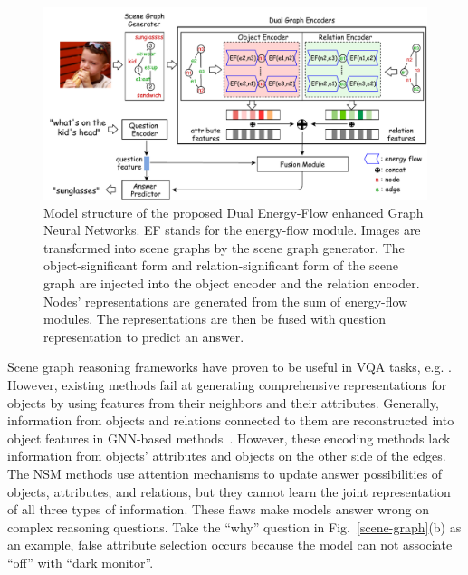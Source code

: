 \documentclass[letterpaper]{article} %
\begin{document}
\begin{figure}[ht] 
    \centering 
    \includegraphics[width=1.0\textwidth]{./pic/DE-GNN.pdf} 
    \caption{Model structure of the proposed Dual Energy-Flow enhanced Graph Neural Networks. EF stands for the energy-flow module. Images are transformed into scene graphs by the scene graph generator. The object-significant form and relation-significant form of the scene graph are injected into the object encoder and the relation encoder. Nodes' representations are generated from the sum of energy-flow modules. The representations are then be fused with question representation to predict an answer.} 
    \label{fig2} 
\end{figure}


Scene graph reasoning frameworks have proven to be useful in VQA tasks, e.g. \cite{johnson2015image,DBLP:journals/corr/abs-2007-01072,yang2020prior}. 
However, existing methods fail at generating comprehensive representations for objects by using features from their neighbors and their attributes. 
Generally, information from objects and relations connected to them are reconstructed into object features in GNN-based methods~\cite{xu2019spatial}.
However, these encoding methods lack information from objects' attributes and objects on the other side of the edges. 
The NSM methods use attention mechanisms to update answer possibilities of objects, attributes, and relations, but they cannot learn the joint representation of all three types of information. These flaws make models answer wrong on complex reasoning questions. Take the ``why'' question in Fig.~\ref{scene-graph}(b) as an example, false attribute selection occurs because the model can not associate ``off'' with ``dark monitor''.
\end{document}
